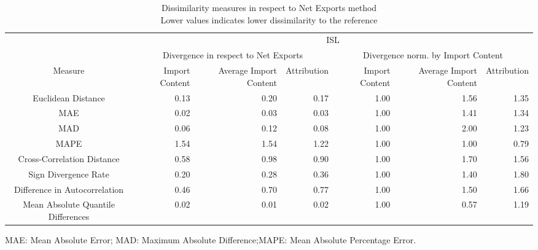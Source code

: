 \begin{table}[t]
\caption*{
{\large Dissimilarity measures in respect to Net Exports method} \\ 
{\small Lower values indicates lower dissimilarity to the reference}
} 
\fontsize{15.0pt}{18.0pt}\selectfont
\begin{tabular*}{\linewidth}{@{\extracolsep{\fill}}crrrrrr}
\toprule
 & \multicolumn{6}{c}{ISL} \\ 
\cmidrule(lr){2-7}
 & \multicolumn{3}{c}{Divergence in respect to Net Exports} & \multicolumn{3}{c}{Divergence norm. by Import Content} \\ 
\cmidrule(lr){2-4} \cmidrule(lr){5-7}
Measure & Import Content & Average Import Content & Attribution & Import Content & Average Import Content & Attribution \\ 
\midrule\addlinespace[2.5pt]
Euclidean Distance & 0.13 & 0.20 & 0.17 & 1.00 & 1.56 & 1.35 \\ 
MAE & 0.02 & 0.03 & 0.03 & 1.00 & 1.41 & 1.34 \\ 
MAD & 0.06 & 0.12 & 0.08 & 1.00 & 2.00 & 1.23 \\ 
MAPE & 1.54 & 1.54 & 1.22 & 1.00 & 1.00 & 0.79 \\ 
Cross-Correlation Distance & 0.58 & 0.98 & 0.90 & 1.00 & 1.70 & 1.56 \\ 
Sign Divergence Rate & 0.20 & 0.28 & 0.36 & 1.00 & 1.40 & 1.80 \\ 
Difference in Autocorrelation & 0.46 & 0.70 & 0.77 & 1.00 & 1.50 & 1.66 \\ 
Mean Absolute Quantile Differences & 0.02 & 0.01 & 0.02 & 1.00 & 0.57 & 1.19 \\ 
\bottomrule
\end{tabular*}
\begin{minipage}{\linewidth}
MAE: Mean Absolute Error; MAD: Maximum Absolute Difference;MAPE: Mean Absolute Percentage Error.\\
\end{minipage}
\end{table}

